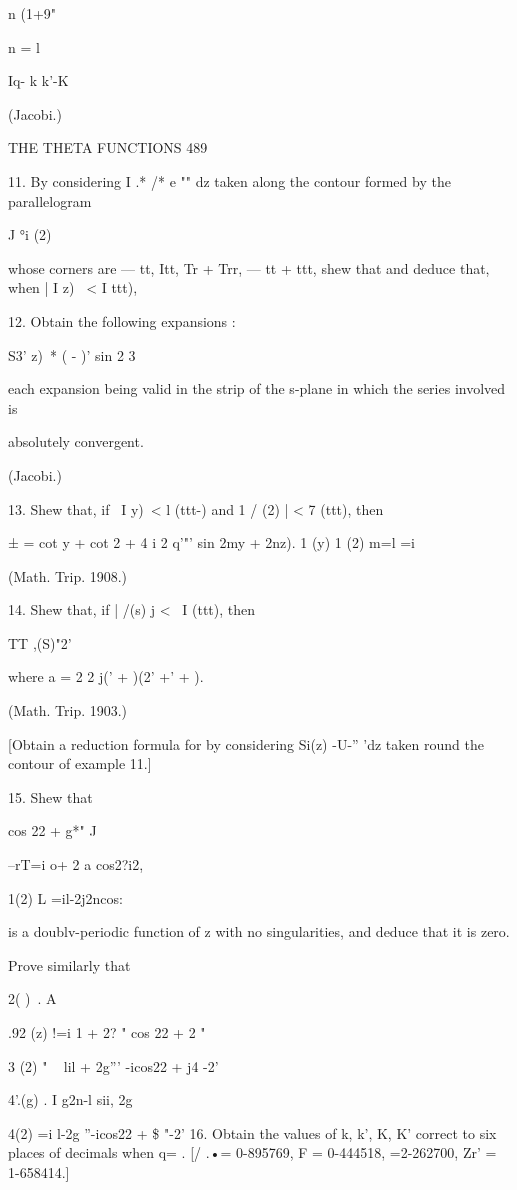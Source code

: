 n (1+9"

n = l



Iq- k k'-K



(Jacobi.)



THE THETA FUNCTIONS 489

11. By considering I .* /* e "" dz taken along the contour formed by
the parallelogram

J °i (2)

whose corners are — tt, Itt, Tr + Trr, — tt + ttt, shew that and
deduce that, when | I z) \ < I ttt),

12. Obtain the following expansions :

S3' z)\ * ( - )' sin 2 3

each expansion being valid in the strip of the s-plane in which the
series involved is

absolutely convergent.

(Jacobi.)

13. Shew that, if \ I y)\ < l (ttt-) and 1 / (2) | < 7 (ttt), then

  ± = cot y + cot 2 + 4 i 2 q'"' sin 2my + 2nz). 1 (y) 1 (2) m=l =i

(Math. Trip. 1908.)

14. Shew that, if | /(s) j < \ I (ttt), then

TT ,(S)"2'

where a = 2 2 j(' + )(2' +' + ).

(Math. Trip. 1903.)

[Obtain a reduction formula for by considering Si(z) -U-'' 'dz taken
round the contour of example 11.]

15. Shew that

cos 22 + g*" J



 --rT=i o+ 2 a cos2?i2,



 1(2) L =il-2j2ncos:

is a doublv-periodic function of z with no singularities, and deduce
that it is zero.

Prove similarly that

 2( )\ . A%

.92 (z) !=i 1 + 2? " cos 22 + 2 "

 3 (2) " ~ lil + 2g''' -icos22 + j4 -2'

 4'.(g) . I g2n-l sii, 2g

  4(2) =i l-2g ''-icos22 + \$ "-2' 16. Obtain the values of k, k', K,
K' correct to six places of decimals when q= . [/ .•= 0-895769, F =
0-444518, =2-262700, Zr' = 1-658414.]



